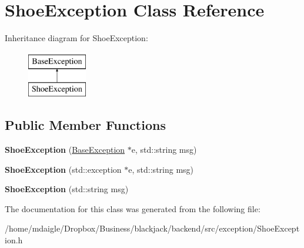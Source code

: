 \hypertarget{classShoeException}{
\section{\-Shoe\-Exception \-Class \-Reference}
\label{classShoeException}
}
\-Inheritance diagram for \-Shoe\-Exception\-:\begin{figure}[H]
\begin{center}
\leavevmode
\includegraphics[height=2.000000cm]{classShoeException}
\end{center}
\end{figure}
\subsection*{\-Public \-Member \-Functions}
\begin{DoxyCompactItemize}
\item 
\hypertarget{classShoeException_a50369aa37f3a4dc2fae2e12465ee38db}{
{\bfseries \-Shoe\-Exception} (\hyperlink{classBaseException}{\-Base\-Exception} $\ast$e, std\-::string msg)}
\label{classShoeException_a50369aa37f3a4dc2fae2e12465ee38db}

\item 
\hypertarget{classShoeException_abae5fbcc8e620449f28ad23812a09bd4}{
{\bfseries \-Shoe\-Exception} (std\-::exception $\ast$e, std\-::string msg)}
\label{classShoeException_abae5fbcc8e620449f28ad23812a09bd4}

\item 
\hypertarget{classShoeException_a29a1d866ed52720e1955a52e020cef71}{
{\bfseries \-Shoe\-Exception} (std\-::string msg)}
\label{classShoeException_a29a1d866ed52720e1955a52e020cef71}

\end{DoxyCompactItemize}


\-The documentation for this class was generated from the following file\-:\begin{DoxyCompactItemize}
\item 
/home/mdaigle/\-Dropbox/\-Business/blackjack/backend/src/exception/\-Shoe\-Exception.\-h\end{DoxyCompactItemize}
